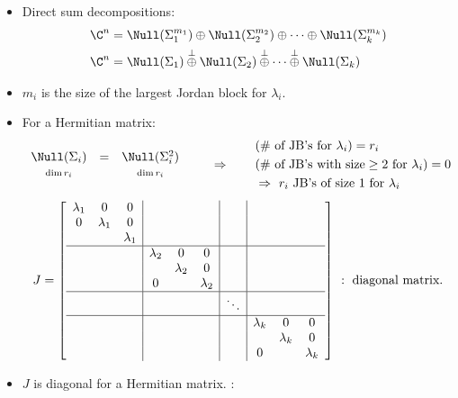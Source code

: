 \begin{itemize}[label=$\ast$]
\item Direct sum decompositions:
\begin{align*}
\C^n&=\Null(\Sigma_1^{m_1})\oplus\Null(\Sigma_2^{m_2})\oplus\cdots\oplus\Null(\Sigma_k^{m_k})\\
\C^n&=\Null(\Sigma_1)\overset{\perp}{\oplus}\Null(\Sigma_2)\overset{\perp}{\oplus}\cdots\overset{\perp}{\oplus}\Null(\Sigma_k)
\end{align*}
\item $m_i$ is the size of the largest Jordan block for $\lambda_i$.
\item\leavevmode{}For a Hermitian matrix:
\[
\begin{array}{ccc}
\Null(\Sigma_i)&=&\Null(\Sigma_i^2)\\
\scriptstyle\dim r_i&&\scriptstyle\dim r_i
\end{array}
\qquad\Rightarrow\qquad
\begin{aligned}
&(\#\text{ of JB's for }\lambda_i)=r_i\\
&(\#\text{ of JB's with size}\geq2\text{ for }\lambda_i)=0\\
&\Rightarrow\ r_i\text{ JB's of size }1\text{ for }\lambda_i
\end{aligned}
\]
\[
J=\left[\begin{array}{ccc|ccc|c|ccc}
\lambda_1&0&0&&&&&&&\\
0&\lambda_1&0&&&&&&&\\
&&\lambda_1&&&&&&&\\\hline
&&&\lambda_2&0&0&&&&\\
&&&&\lambda_2&0&&&&\\
&&&0&&\lambda_2&&&&\\\hline
&&&&&&\ddots&&&\\\hline
&&&&&&&\lambda_k&0&0\\
&&&&&&&&\lambda_k&0\\
&&&&&&&0&&\lambda_k
\end{array}\right]
\ :\ \text{diagonal matrix.}
\]
\item $J$ is diagonal for a Hermitian matrix. :

\end{itemize}
